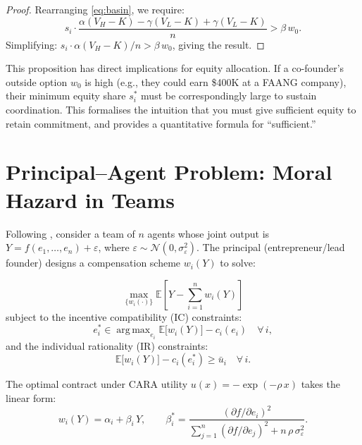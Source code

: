 \documentclass[12pt,a4paper,oneside]{book}
\theoremstyle{definition}
\theoremstyle{remark}
\newcommand{\E}{\mathbb{E}}
\newcommand{\argmax}{\operatorname{arg\,max}}
\begin{document}
\begin{proof}
Rearranging \eqref{eq:basin}, we require:
\[
  s_i \cdot \frac{\alpha(V_H - K) - \gamma(V_L - K) + \gamma(V_L - K)}{n}
  > \beta\,w_0.
\]
Simplifying: $s_i \cdot \alpha(V_H - K) / n > \beta\,w_0$, giving the result.
\end{proof}

\begin{practicalimplication}
This proposition has direct implications for equity allocation. If a co-founder's
outside option $w_0$ is high (e.g., they could earn \$400K at a FAANG company), their
minimum equity share $s_i^*$ must be correspondingly large to sustain coordination. This
formalises the intuition that you must give sufficient equity to retain commitment,
and provides a quantitative formula for ``sufficient.''
\end{practicalimplication}

\section{Principal--Agent Problem: Moral Hazard in Teams}

Following \citet{Holmstrom1982}, consider a team of $n$ agents whose joint
output is $Y = f(e_1, \ldots, e_n) + \varepsilon$, where $\varepsilon \sim
\mathcal{N}(0, \sigma_\varepsilon^2)$. The principal (entrepreneur/lead
founder) designs a compensation scheme $w_i(Y)$ to solve:

\begin{equation}\label{eq:moral_hazard}
  \max_{\{w_i(\cdot)\}} \E\left[Y - \sum_{i=1}^n w_i(Y)\right]
\end{equation}
subject to the incentive compatibility (IC) constraints:
\begin{equation}\label{eq:ic}
  e_i^* \in \argmax_{e_i} \E\bigl[w_i(Y)\bigr] - c_i(e_i)
  \quad \forall\, i,
\end{equation}
and the individual rationality (IR) constraints:
\begin{equation}\label{eq:ir}
  \E\bigl[w_i(Y)\bigr] - c_i(e_i^*) \geq \bar{u}_i
  \quad \forall\, i.
\end{equation}

The optimal contract under CARA utility $u(x) = -\exp(-\rho\,x)$ takes
the linear form:
\begin{equation}\label{eq:linear_contract}
  w_i(Y) = \alpha_i + \beta_i\,Y,
  \qquad
  \beta_i^* = \frac{(\partial f/\partial e_i)^2}
    {\sum_{j=1}^n (\partial f/\partial e_j)^2
    + n\,\rho\,\sigma_\varepsilon^2}.
\end{equation}
\end{document}
